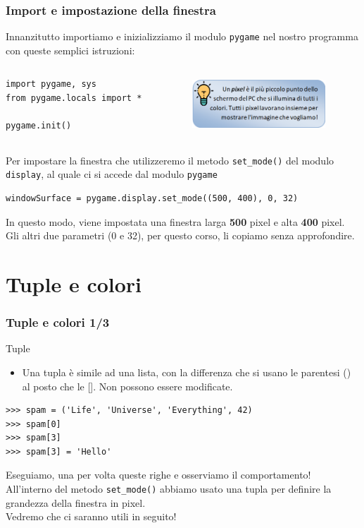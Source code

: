 \documentclass{beamer}
\begin{document}
\begin{frame}[fragile]
\frametitle{Import e impostazione della finestra}
	Innanzitutto importiamo e inizializziamo il modulo \texttt{pygame} nel nostro programma con queste semplici istruzioni:
	\begin{columns}[T]
		\begin{column}[T]{0.55\textwidth}
	\begin{lstlisting}
import pygame, sys
from pygame.locals import *

pygame.init()
	\end{lstlisting}
		\end{column}
\begin{column}[T]{0.45\textwidth}
	\begin{figure}[t]
		\includegraphics[height=2cm, width=5cm]{images/pixel.png}
	\end{figure}
\end{column}
\end{columns}
	Per impostare la finestra che utilizzeremo il metodo \texttt{set\_mode()} del modulo \texttt{display}, al quale ci si accede dal modulo \texttt{pygame}
\begin{lstlisting}
windowSurface = pygame.display.set_mode((500, 400), 0, 32)
\end{lstlisting}
In questo modo, viene impostata una finestra larga \textbf{500} pixel e alta \textbf{400} pixel. Gli altri due parametri (0 e 32), per questo corso, li copiamo senza approfondire.
\end{frame}

\section{Tuple e colori}

\begin{frame}[fragile]
\frametitle{Tuple e colori 1/3}
	\begin{block}{Tuple}
		\begin{itemize}
			\item Una tupla è simile ad una lista, con la differenza che si usano le parentesi () al posto che le []. Non possono essere modificate.
		\end{itemize}
	\end{block}
\begin{lstlisting}
>>> spam = ('Life', 'Universe', 'Everything', 42)
>>> spam[0]
>>> spam[3]
>>> spam[3] = 'Hello'
\end{lstlisting}
Eseguiamo, una per volta queste righe e osserviamo il comportamento!\\
All'interno del metodo \texttt{set\_mode()} abbiamo usato una tupla per definire la grandezza della finestra in pixel.\\
Vedremo che ci saranno utili in seguito!
\end{frame}
\end{document}

